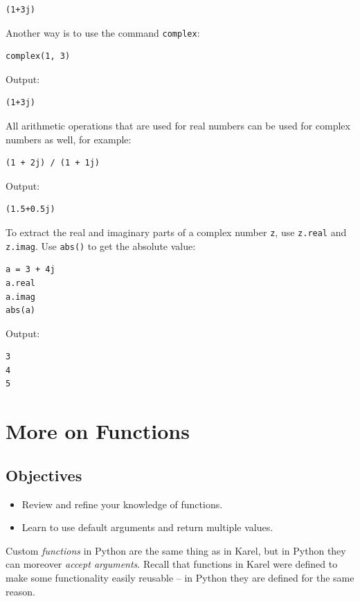 \begin{verbatim}
(1+3j)
\end{verbatim}
Another way is to use the command {\tt complex}:

\begin{verbatim}
complex(1, 3)
\end{verbatim}
Output:

\begin{verbatim}
(1+3j)
\end{verbatim}
All arithmetic operations that are used for real numbers can be 
used for complex numbers as well, for example:

\begin{verbatim}
(1 + 2j) / (1 + 1j)
\end{verbatim}
Output:

\begin{verbatim}
(1.5+0.5j)
\end{verbatim}
To extract the real and imaginary parts of a complex number {\tt z}, use {\tt z.real}
and {\tt z.imag}. Use {\tt abs()} to get the absolute value:

\begin{verbatim}
a = 3 + 4j
a.real
a.imag
abs(a)
\end{verbatim}
Output:

\begin{verbatim}
3
4
5
\end{verbatim}


\section{More on Functions}

\subsection{Objectives}

\begin{itemize}
\item Review and refine your knowledge of functions.
\item Learn to use default arguments and return multiple values.
\end{itemize}
Custom {\em functions} in Python are the same thing as in Karel, 
but in Python they can moreover {\em accept arguments}. Recall that 
functions in Karel were defined to make some functionality easily 
reusable -- in Python they are defined for the same reason.

